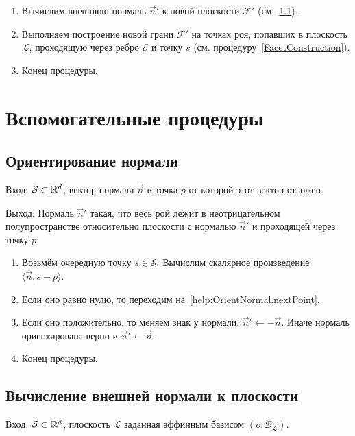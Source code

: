 \documentclass[a4paper,12pt]{article}
\newcommand{\R}[1][]{%
  \ifthenelse{\equal{#1}{}}%
  {\mathbb{R}}%
  {\mathbb{R}^{#1}}}
\newcommand{\Swarm}{\mathcal{S}}              %
\newcommand{\Facet}{\mathcal{F}}              %
\newcommand{\Edge}{\mathcal{E}}               %
\newcommand{\Basis}{\mathcal{B}}              %
\newcommand{\scalprod}[3][]{#1\langle #2, #3 #1\rangle} %
\newcommand{\Plane}{\mathcal{L}}           %
\renewcommand{\.}{\hspace{0.2ex}}
\begin{document}
\begin{enumerate}
      \item Вычислим внешнюю нормаль $\vec n'$ к новой плоскости $\Facet'$ (см.~\ref{help:OrientNormal}).

      \item Выполняем построение новой грани $\Facet'$ на точках роя, попавших в плоскость $\Plane$, проходящую через ребро $\Edge$ и точку $s$ (см. процедуру~\ref{FacetConstruction}).

      \item Конец процедуры.

    \end{enumerate}


\section{Вспомогательные процедуры}

  \subsection{Ориентирование нормали}
    \label{help:OrientNormal}
    Вход: $\Swarm \subset \R[d]$, вектор нормали $\vec n$ и точка $p$ от которой этот вектор отложен.

    Выход: Нормаль $\vec n'$ такая, что весь рой лежит в неотрицательном полупространстве относительно плоскости с нормалью $\vec n'$ и проходящей через точку $p$.

    \begin{enumerate}
      \label{help:OrientNormal.nextPoint}
      \item Возьмём очередную точку $s \in \Swarm$. Вычислим скалярное произведение $\scalprod{\vec n}{s - p}$.

      \item Если оно равно нулю, то переходим на~\ref{help:OrientNormal.nextPoint}.


      \item Если оно положительно, то меняем знак у нормали: $\vec n' \leftarrow - \vec n$. Иначе нормаль ориентирована верно и $\vec n' \leftarrow \vec n$.

      \item Конец процедуры.
    \end{enumerate}

    \subsection{Вычисление внешней нормали к плоскости}
      \label{help:CalcOuterNormal}
    Вход: $\Swarm \subset \R[d]$, плоскость $\Plane$ заданная аффинным базисом $(o, \Basis_\Plane)$.
\end{document}
